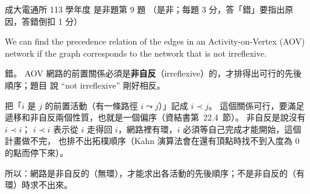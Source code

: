 \begin{pastexam}[label={px:ncku-113-cce-08}]{成大電通所 113 學年度 是非題第 9 題}
（是非；每題 3 分，答「錯」要指出原因，答錯倒扣 1 分）

We can find the precedence relation of the edges in an Activity-on-Vertex (AOV) network if the
graph corresponds to the network that is not irreflexive.
\end{pastexam}

\begin{pastsoln}
錯。 AOV 網路的前置關係必須是\textbf{非自反}（irreflexive）的，才排得出可行的先後順序；題目
說 ``not irreflexive'' 剛好相反。

把「$i$ 是 $j$ 的前置活動（有一條路徑 $i \leadsto j$）」記成 $i \prec j$。 這個關係可行，要滿足
遞移和非自反兩個性質，也就是一個偏序（資結書第~22.4~節）。 非自反是說沒有 $i \prec i$；
$i \prec i$ 表示從 $i$ 走得回 $i$，網路裡有環，$i$ 必須等自己完成才能開始，這個計畫做不完，
也排不出拓樸順序（Kahn 演算法會在還有頂點時找不到入度為 $0$ 的點而停下來）。

所以：網路是非自反的（無環），才能求出各活動的先後順序；不是非自反的（有環）時求不出來。
\end{pastsoln}
